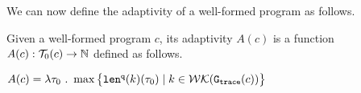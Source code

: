 
 We can now define the adaptivity of a well-formed program as follows.
\begin{defn}
    \label{def:trace_adapt}
    Given a well-formed program ${c}$, 
    its adaptivity $A(c)$ is a function 
    $A(c) : \mathcal{T}_0(c)\to \mathbb{N}$
    defined as follows.
\begin{center}
$
    A(c) = \lambda \mathtt{\tau}_0 ~.~ \max \big 
    \{ \mathtt{len}^{\tt q}(k)(\mathtt{\tau}_0) \mid k \in \mathcal{WK}(\mathtt{{G_{trace}}}(c)) \big \} 
$
\end{center}
\end{defn}

